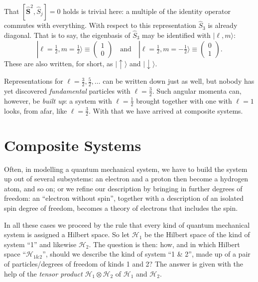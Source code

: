 That $[\widehat{\mathbf{S}}^2,\widehat{S}_j]=0$ holds is trivial here: a multiple of the identity operator commutes with everything. With respect to this representation $\widehat{S}_3$ is already diagonal. That is to say, the eigenbasis of $\widehat{S}_3$ may be identified with $|\ell,m\rangle$:
\begin{equation}
	|\ell=\tfrac12,m=\tfrac12\rangle \equiv \begin{pmatrix}
		1 \\ 0
	\end{pmatrix}\quad\text{and}\quad 
	|\ell=\tfrac12,m=-\tfrac12\rangle \equiv\begin{pmatrix}
		0 \\ 1
	\end{pmatrix}.
\end{equation}
These are also written, for short, as $|\uparrow\rangle$ and $|\downarrow\rangle$.

Representations for $\ell=\frac32,\frac52,\ldots$ can be written down just as well, but nobody has yet discovered \emph{fundamental} particles with $\ell=\frac32$. Such angular momenta can, however, be \emph{built up}: a system with $\ell=\frac12$ brought together with one with $\ell=1$ looks, from afar, like $\ell=\frac32$. With that we have arrived at composite systems.

\section*{Composite Systems}
Often, in modelling a quantum mechanical system, we have to build the system up out of several subsystems: an electron and a proton then become a hydrogen atom, and so on; or we refine our description by bringing in further degrees of freedom: an ``electron without spin'', together with a description of an isolated spin degree of freedom, becomes a theory of electrons that includes the spin.

In all these cases we proceed by the rule that every kind of quantum mechanical
system is assigned a Hilbert space. So let $\mathcal{H}_1$ be the Hilbert space of the kind of system ``1'' and likewise $\mathcal{H}_2$. The question is then: how, and in which Hilbert space ``$\mathcal{H}_{\text{$1$\&$2$}}$'', should we describe the kind of system ``1 \& 2'', made up of a pair of particles/degrees of freedom of kinds 1 and 2? The answer is given with the help of the \emph{tensor product} $\mathcal{H}_1\otimes \mathcal{H}_2$ of $\mathcal{H}_1$ and $\mathcal{H}_2$.

